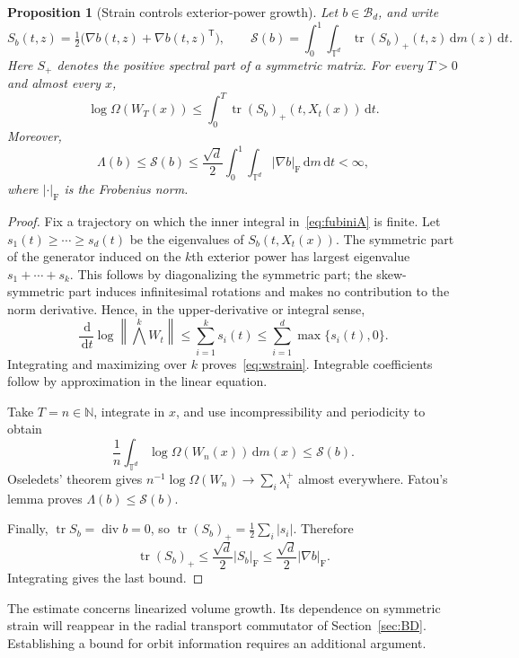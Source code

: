 \documentclass[review,12pt,times,a4paper,nopreprintline]{elsarticle}
\theoremstyle{plain}
\newtheorem{proposition}[theorem]{Proposition}
\theoremstyle{definition}
\theoremstyle{remark}
\newcommand{\T}{\mathbb T}
\newcommand{\N}{\mathbb N}
\newcommand{\B}{\mathscr B}
\newcommand{\dd}{\,\mathrm d}
\newcommand{\tr}{\operatorname{tr}}
\newcommand{\diver}{\operatorname{div}}
\newcommand{\action}{\mathcal S}
\numberwithin{equation}{section}
\begin{document}
\begin{proposition}[Strain controls exterior-power growth]\label{prop:strain}
Let $b\in\B_d$, and write
\[
 S_b(t,z)=\tfrac12\bigl(\nabla b(t,z)+\nabla b(t,z)^{\mathsf T}\bigr),\qquad
 \action(b)=\int_0^1\int_{\T^d}\tr(S_b)_+(t,z)\dd m(z)\dd t.
\]
Here $S_+$ denotes the positive spectral part of a symmetric matrix. For every $T>0$ and almost every $x$,
\begin{equation}\label{eq:wstrain}
 \log\Omega(W_T(x))\leq\int_0^T\tr(S_b)_+(t,X_t(x))\dd t.
\end{equation}
Moreover,
\begin{equation}\label{eq:lambdastr}
 \Lambda(b)\leq\action(b)
 \leq\frac{\sqrt d}{2}\int_0^1\int_{\T^d}|\nabla b|_{\mathrm F}\dd m\dd t<\infty,
\end{equation}
where $|\cdot|_{\mathrm F}$ is the Frobenius norm.
\end{proposition}
\begin{proof}
Fix a trajectory on which the inner integral in~\eqref{eq:fubiniA} is finite. Let $s_1(t)\geq\cdots\geq s_d(t)$ be the eigenvalues of $S_b(t,X_t(x))$. The symmetric part of the generator induced on the $k$th exterior power has largest eigenvalue $s_1+\cdots+s_k$. This follows by diagonalizing the symmetric part; the skew-symmetric part induces infinitesimal rotations and makes no contribution to the norm derivative. Hence, in the upper-derivative or integral sense,
\[
 \frac{\dd}{\dd t}\log\left\|\bigwedge^kW_t\right\|
 \leq\sum_{i=1}^ks_i(t)
 \leq\sum_{i=1}^d\max\{s_i(t),0\}.
\]
Integrating and maximizing over $k$ proves~\eqref{eq:wstrain}. Integrable coefficients follow by approximation in the linear equation.

Take $T=n\in\N$, integrate in $x$, and use incompressibility and periodicity to obtain
\[
 \frac1n\int_{\T^d}\log\Omega(W_n(x))\dd m(x)\leq\action(b).
\]
Oseledets' theorem gives $n^{-1}\log\Omega(W_n)\to\sum_i\lambda_i^+$ almost everywhere. Fatou's lemma proves $\Lambda(b)\leq\action(b)$.

Finally, $\tr S_b=\diver b=0$, so $\tr(S_b)_+=\frac12\sum_i|s_i|$. Therefore
\[
 \tr(S_b)_+\leq\frac{\sqrt d}{2}|S_b|_{\mathrm F}
 \leq\frac{\sqrt d}{2}|\nabla b|_{\mathrm F}.
\]
Integrating gives the last bound.
\end{proof}

The estimate concerns linearized volume growth. Its dependence on symmetric strain will reappear in the radial transport commutator of Section~\ref{sec:BD}. Establishing a bound for orbit information requires an additional argument.
\end{document}
